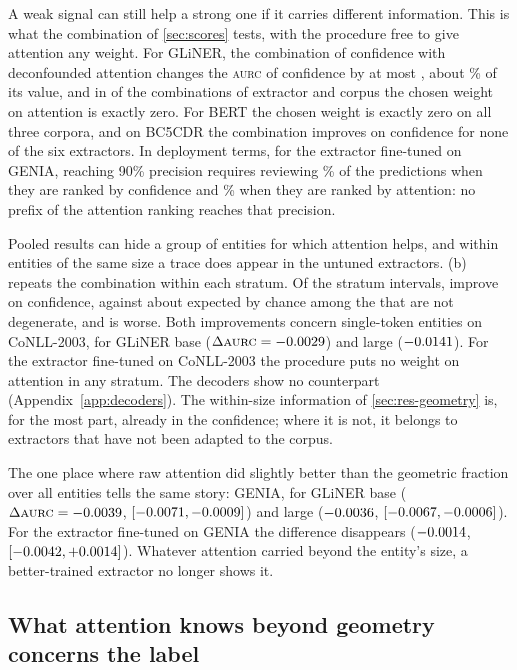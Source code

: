 \documentclass[11pt,a4paper]{article}
\newcommand{\gliner}{GLiNER}
\newcommand{\aurc}{\textsc{aurc}}
\begin{document}
A weak signal can still help a strong one if it carries different information. This is what the combination of
\cref{sec:scores} tests, with the procedure free to give attention any weight. For \gliner{}, the combination of confidence
with deconfounded attention changes the \aurc{} of confidence by at most \cthreeMaxAbs, about \cthreeMaxRel\% of its value,
and in \cthreeZeroPairs{} of the \cthreePairs{} combinations of extractor and corpus the chosen weight on attention is exactly
zero. For BERT the chosen weight is exactly zero on all three corpora, and on BC5CDR the combination improves on confidence
for none of the six extractors. In deployment terms, for the extractor fine-tuned on GENIA, reaching 90\% precision requires
reviewing \loadTunedGeniaConf\% of the predictions when they are ranked by confidence and \loadTunedGeniaMass\% when they are
ranked by attention: no prefix of the attention ranking reaches that precision.

Pooled results can hide a group of entities for which attention helps, and within entities of the same size a trace does
appear in the untuned extractors. (b) repeats the combination within each stratum. Of the
\strataCthreeN{} stratum intervals, \strataCthreeFav{} improve on confidence, against about \strataCthreeChance{} expected by
chance among the \strataCthreeNonDeg{} that are not degenerate, and \strataCthreeAdv{} is worse. Both improvements concern
single-token entities on CoNLL-2003, for \gliner{} base ($\Delta\aurc=\cthreeKoneConllBaseD$) and large
($-0.0141$). For the extractor fine-tuned on CoNLL-2003 the procedure puts no weight on attention in any
stratum. The decoders show no counterpart (Appendix~\ref{app:decoders}). The within-size information of \cref{sec:res-geometry} is,
for the most part, already in the confidence; where it is not, it belongs to extractors that have not been adapted to the
corpus.

The one place where raw attention did slightly better than the geometric fraction over all entities tells the same story:
GENIA, for \gliner{} base ($\Delta\aurc=\ctwoGeniaBaseD$, $[-0.0071, -0.0009]$) and large
($-0.0036$, $[-0.0067, -0.0006]$). For the extractor fine-tuned on GENIA the difference
disappears ($-0.0014$, $[-0.0042, +0.0014]$). Whatever attention carried beyond the entity's
size, a better-trained extractor no longer shows it.



\subsection{What attention knows beyond geometry concerns the label}
\label{sec:res-errors}
\end{document}
